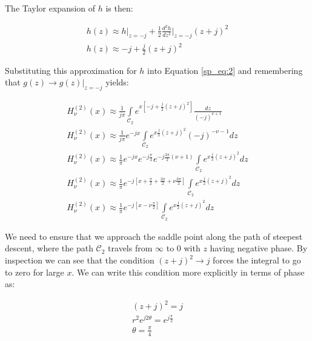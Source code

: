 The Taylor expansion of $h$ is then:

\begin{equation}
  \begin{gathered}
    h(z) \approx h\bigg|_{z=-j} + \frac{1}{2}\frac{d^2h}{dz^2}\bigg|_{z=-j}\left(z+j \right)^2\\
    h(z) \approx -j + \frac{j}{2}\left(z+j \right)^2 
    \end{gathered}
  \label{sp_eq:3}
  \end{equation}
\renewcommand{\baselinestretch}{2} \small\normalsize

Substituting this approximation for $h$ into Equation \ref{sp_eq:2} and remembering that $g(z) \rightarrow g(z)|_{z=-j}$ yields:

\begin{equation}
  \begin{gathered}
    H_{\nu}^{(2)}(x) \approx \frac{1}{j\pi}\int\limits_{\mathcal{C}_2}e^{x\left[-j + \frac{j}{2}\left(z+j \right)^2 \right]} \frac{dz}{(-j)^{\nu+1}} \\
    H_{\nu}^{(2)}(x) \approx \frac{1}{j\pi}e^{-jx}\int\limits_{\mathcal{C}_2}e^{x\frac{j}{2}\left(z+j \right)^2}(-j)^{-\nu - 1} dz \\
    H_{\nu}^{(2)}(x) \approx \frac{1}{\pi}e^{-jx}e^{-j\frac{\pi}{2}}e^{-j\frac{3\pi}{2}\left(\nu +1\right)}\int\limits_{\mathcal{C}_2}e^{x\frac{j}{2}\left(z+j \right)^2} dz \\
    H_{\nu}^{(2)}(x) \approx \frac{1}{\pi}e^{-j\left[x +\frac{\pi}{2} +\frac{3\pi}{2} + \nu\frac{3\pi}{2}\right]}\int\limits_{\mathcal{C}_2}e^{x\frac{j}{2}\left(z+j \right)^2} dz \\
     H_{\nu}^{(2)}(x) \approx \frac{1}{\pi}e^{-j\left[x - \nu\frac{\pi}{2}\right]}\int\limits_{\mathcal{C}_2}e^{x\frac{j}{2}\left(z+j \right)^2} dz 
    \end{gathered}
  \label{sp_eq:4}
  \end{equation}
\renewcommand{\baselinestretch}{2} \small\normalsize

We need to ensure that we approach the saddle point along the path of steepest descent, where the path $\mathcal{C}_2$ travels from $\infty$ to $0$ with $z$ having negative phase. By inspection we can see that the condition $\left(z+j \right)^2 \rightarrow j$ forces the integral to go to zero for large $x$. We can write this condition more explicitly in terms of phase as:

\begin{equation}
  \begin{gathered}
    \left(z + j \right)^2=j \\
    r^2e^{j2\theta} = e^{j\frac{\pi}{2}} \\
    \theta = \frac{\pi}{4}
    \end{gathered}
  \label{sp_eq:5}
  \end{equation}
\renewcommand{\baselinestretch}{2} \small\normalsize

